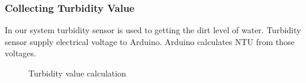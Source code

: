 \subsubsection*{Collecting Turbidity Value}
In our system turbidity sensor is used to getting the dirt level of water. Turbidity sensor supply electrical voltage to Arduino. Arduino calculates NTU from those voltages.

\begin{figure}[H]
\centering
{} 
\hspace{2cm}

\caption{Turbidity value calculation}
\end{figure}
